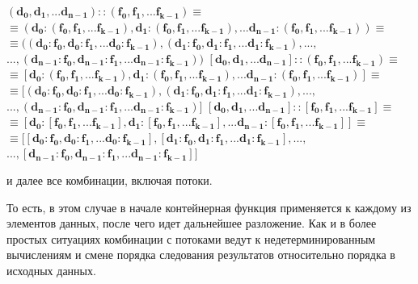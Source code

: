 \begin{center}
$\mathbf{(d_0, d_1, ... d_{n-1})::(f_0, f_1, ... f_{k-1}) \equiv}$ \\
$\mathbf{\equiv (d_0:(f_0, f_1, ... f_{k-1}), d_1:(f_0, f_1, ... f_{k-1}), ... d_{n-1}:(f_0, f_1, ... f_{k-1})) \equiv}$ \\
$\mathbf{\equiv ((d_0:f_0, d_0:f_1, ... d_0:f_{k-1}), (d_1:f_0, d_1:f_1, ... d_1:f_{k-1}), ...,} $\\
$\mathbf{...,  (d_{n-1}:f_0, d_{n-1}:f_1, ... d_{n-1}:f_{k-1}))}$
\newline
\newline
$\mathbf{[d_0, d_1, ... d_{n-1}]::(f_0, f_1, ... f_{k-1}) \equiv}$ \\
$\mathbf{\equiv [d_0:(f_0, f_1, ... f_{k-1}), d_1:(f_0, f_1, ... f_{k-1}), ... d_{n-1}:(f_0, f_1, ... f_{k-1})] \equiv}$ \\
$\mathbf{\equiv [(d_0:f_0, d_0:f_1, ... d_0:f_{k-1}), (d_1:f_0, d_1:f_1, ... d_1:f_{k-1}), ...,}$\\
$\mathbf{...,  (d_{n-1}:f_0, d_{n-1}:f_1, ... d_{n-1}:f_{k-1})]}$
\newline
\newline
$\mathbf{[d_0, d_1, ... d_{n-1}]::[f_0, f_1, ... f_{k-1}] \equiv}$ \\
$\mathbf{\equiv [d_0:[f_0, f_1, ... f_{k-1}], d_1:[f_0, f_1, ... f_{k-1}], ... d_{n-1}:[f_0, f_1, ... f_{k-1}]] \equiv}$ \\
$\mathbf{\equiv [[d_0:f_0, d_0:f_1, ... d_0:f_{k-1}], [d_1:f_0, d_1:f_1, ... d_1:f_{k-1}], ...,}$\\
$\mathbf{...,  [d_{n-1}:f_0, d_{n-1}:f_1, ... d_{n-1}:f_{k-1}]]}$
\end{center}
и далее все комбинации, включая потоки.

То есть, в этом случае в начале контейнерная функция применяется к каждому из элементов данных, после чего идет дальнейшее разложение. Как и в более простых ситуациях комбинации с потоками ведут к недетерминированным вычислениям и смене порядка следования результатов относительно порядка в исходных данных.

